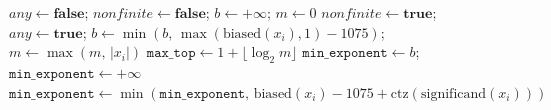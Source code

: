 \documentclass[varwidth=6.2in,border=3pt]{standalone}
\newcommand{\code}[1]{\texttt{#1}}
\begin{document}
\begin{algorithmic}[1]
\State $\mathit{any} \gets \textbf{false}$;\; $\mathit{nonfinite} \gets \textbf{false}$;\; $b \gets +\infty$;\; $m \gets 0$
 
   $\mathit{nonfinite} \gets \textbf{true}$; \Return \EndIf
    \State $\mathit{any} \gets \textbf{true}$;\; $b \gets \min(b,\, \max(\mathrm{biased}(x_i), 1) - 1075)$;\; $m \gets \max(m,\, |x_i|)$
  \EndIf
\EndFor
{} \Return \EndIf
\State $\code{max\_top} \gets 1 + \lfloor \log_2 m \rfloor$ 
 $\code{min\_exponent} \gets b$; \Return {} \EndIf
\State $\code{min\_exponent} \gets +\infty$
 
  \State $\code{min\_exponent} \gets \min(\code{min\_exponent},\, \mathrm{biased}(x_i) - 1075 + \mathrm{ctz}(\mathrm{significand}(x_i)))$
\EndFor
\end{algorithmic}
\end{document}
